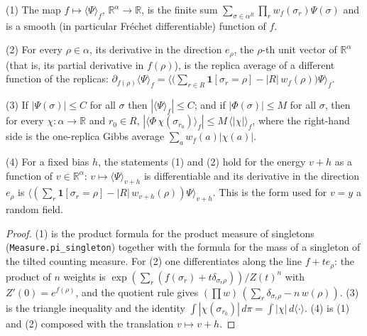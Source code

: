 \begin{lemma}
(1) The map $f\mapsto\langle\Psi\rangle_f$, $\mathbb R^\alpha\to\mathbb R$, is the finite sum
$\sum_{\sigma\in\alpha^R}\prod_rw_f(\sigma_r)\Psi(\sigma)$ and is a smooth (in particular Fr\'echet differentiable) function of $f$.

(2) For every $\rho\in\alpha$, its derivative in the direction $e_\rho$, the $\rho$-th unit vector of $\mathbb R^\alpha$ (that is, its
partial derivative in $f(\rho)$), is the replica average of a different function of the replicas:
$\partial_{f(\rho)}\langle\Psi\rangle_f=\big\langle\big(\sum_{r\in R}\mathbf 1[\sigma_r=\rho]-|R|\,w_f(\rho)\big)\Psi\big\rangle_f$.

(3) If $|\Psi(\sigma)|\le C$ for all $\sigma$ then $|\langle\Psi\rangle_f|\le C$; and if $|\Phi(\sigma)|\le M$ for all $\sigma$, then for
every $\chi:\alpha\to\mathbb R$ and $r_0\in R$,
$|\langle\Phi\,\chi(\sigma_{r_0})\rangle_f|\le M\,\langle|\chi|\rangle_f$, where the right-hand side is the one-replica Gibbs average
$\sum_aw_f(a)|\chi(a)|$.

(4) For a fixed bias $h$, the statements (1) and (2) hold for the energy $v+h$ as a function of $v\in\mathbb R^\alpha$:
$v\mapsto\langle\Psi\rangle_{v+h}$ is differentiable and its derivative in the direction $e_\rho$ is
$\big\langle(\sum_r\mathbf 1[\sigma_r=\rho]-|R|\,w_{v+h}(\rho))\Psi\big\rangle_{v+h}$. This is the form used for $v=y$ a random field.
\end{lemma}

\begin{proof}
  \leanok
(1) is the product formula for the product measure of singletons (\texttt{Measure.pi\_singleton}) together with the formula for the
mass of a singleton of the tilted counting measure. For (2) one differentiates along the line $f+te_\rho$: the product of $n$
weights is $\exp(\sum_r(f(\sigma_r)+t\delta_{\sigma_r\rho}))/Z(t)^n$ with $Z'(0)=e^{f(\rho)}$, and the quotient rule gives
$(\prod w)\,(\sum_r\delta_{\sigma_r\rho}-n\,w(\rho))$. (3) is the triangle inequality and the identity
$\int|\chi(\sigma_{r_0})|\,d\pi=\int|\chi|\,d\langle\cdot\rangle$. (4) is (1) and (2) composed with the translation $v\mapsto v+h$.
\end{proof}

